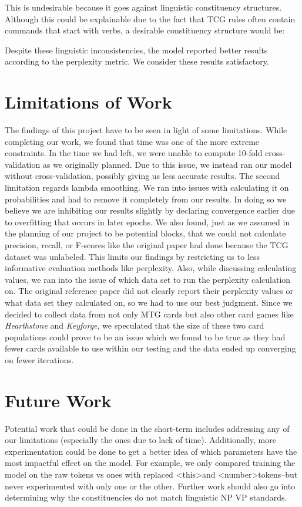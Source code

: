 \documentclass[11pt,a4paper]{article}
\begin{document}
This is undesirable because it goes against linguistic constituency structures. Although this could be explainable due to the fact that TCG rules often contain commands that start with verbs, a desirable constituency structure would be:

\hspace{0.05in}

Despite these linguistic inconsistencies, the model reported better results according to the perplexity metric. We consider these results satisfactory.

\section{Limitations of Work}

The findings of this project have to be seen in light of some limitations. While completing our work, we found that time was one of the more extreme constraints. In the time we had left, we were unable to compute 10-fold cross-validation as we originally planned. Due to this issue, we instead ran our model without cross-validation, possibly giving us less accurate results. The second limitation regards lambda smoothing. We ran into issues with calculating it on probabilities and had to remove it completely from our results. In doing so we believe we are inhibiting our results slightly by declaring convergence earlier due to overfitting that occurs in later epochs. We also found, just as we assumed in the planning of our project to be potential blocks, that we could not calculate precision, recall, or F-scores like the original paper had done because the TCG dataset was unlabeled. This limits our findings by restricting us to less informative evaluation methods like perplexity. Also, while discussing calculating values, we ran into the issue of which data set to run the perplexity calculation on. The original reference paper did not clearly report their perplexity values or what data set they calculated on, so we had to use our best judgment. Since we decided to collect data from not only MTG cards but also other card games like \emph{Hearthstone} and \emph{Keyforge}, we speculated that the size of these two card populations could prove to be an issue which we found to be true as they had fewer cards available to use within our testing and the data ended up converging on fewer iterations. 

\section{Future Work}
Potential work that could be done in the short-term includes addressing any of our limitations (especially the ones due to lack of time). Additionally, more experimentation could be done to get a better idea of which parameters have the most impactful effect on the model. For example, we only compared training the model on the raw tokens vs ones with replaced \textless this\textgreater and \textless number\textgreater tokens--but never experimented with only one or the other. Further work should also go into determining why the constituencies do not match linguistic NP VP standards.
\end{document}

